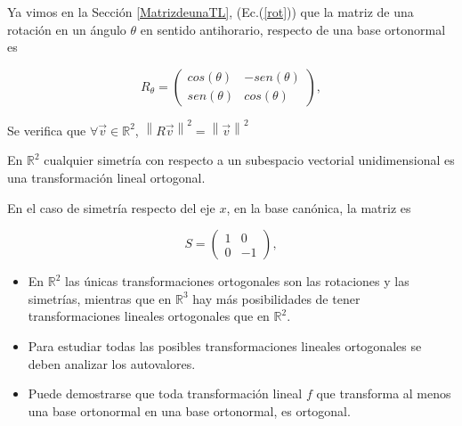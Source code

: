 {\begin{example}
  Ya vimos en la Sección \ref{MatrizdeunaTL},  (Ec.(\ref{rot})) que la matriz de una  rotación en un ángulo $\theta$ en sentido antihorario, respecto de una base ortonormal es 
  
  \begin{equation}
R_{\theta}= \left(\begin{array}{cc} cos(\theta)   & -sen(\theta) \\ sen(\theta) & cos(\theta)
\end{array}
 \right), \label{400}
\end{equation}

\bigskip

Se verifica  que   $\forall \vec{v} \in \mathbb{R}^{2}  $,  $ \left\|R \vec{v}\right\|^{2} =  \left\|\vec{v}\right\|^{2}$
   \end{example} 
   
\bigskip
  
\begin{example}
  En $\mathbb{R}^{2}$ cualquier simetría con respecto a un subespacio vectorial unidimensional es una transformación lineal ortogonal.  
  
  
  En el caso de simetría respecto del eje $x$, en la base canónica, la matriz es 
  
  
  \begin{equation}
S= \left(\begin{array}{cc} 1   & 0\\ 0 & -1
\end{array}
 \right), \label{500}
\end{equation}



\end{example} 
  
\begin{remark}
\begin{itemize}
     \item 
     En $\mathbb{R}^{2}$ las únicas transformaciones ortogonales son las rotaciones y las simetrías, mientras que en
     $\mathbb{R}^{3}$ hay más  posibilidades de tener transformaciones lineales ortogonales que en $\mathbb{R}^{2}$.
\item
Para estudiar todas las posibles transformaciones lineales ortogonales se deben analizar los autovalores.
\item
Puede demostrarse que toda transformación lineal $f$ que transforma al menos una base ortonormal en una base ortonormal, es ortogonal.
\end{itemize}
\end{remark}

}
